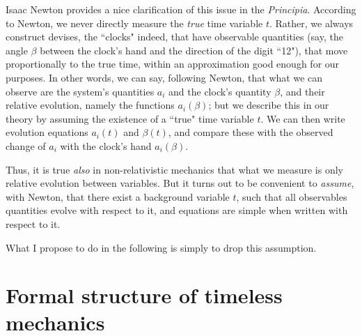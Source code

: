 \documentclass[10pt,nofootinbib]{revtex4}
\begin{document}
Isaac Newton provides a nice clarification of this issue in the {\em Principia}. According to Newton, we never directly measure the \emph{true} time variable $t$.  Rather, we always construct  devises, the ``clocks" indeed, that have observable quantities (say, the angle $\beta$ between the clock's hand and the direction of the digit ``12"), that move proportionally to the true time, within an approximation good enough for our purposes.   In other words, we can say, following Newton, that what we can observe are the system's quantities $a_i$ and the clock's quantity $\beta$, and their relative evolution, namely the functions $a_i(\beta)$; but we describe this in our theory by assuming the existence of a ``true" time variable $t$.  We can then write evolution equations $a_i(t)$ and $\beta(t)$, and compare these with the observed change of $a_i$ with the clock's hand $a_i(\beta)$.  

Thus, it is true \emph{also} in non-relativistic mechanics that what we measure is only relative evolution between variables.   But it turns out to be convenient to \emph{assume}, with Newton, that there exist a background variable $t$, such that all observables quantities evolve with respect to it, and equations are simple when written with respect to it.   

What I propose to do in the following is simply to drop this assumption. 

\section{Formal structure of timeless mechanics}\label{timeless}
\end{document}
